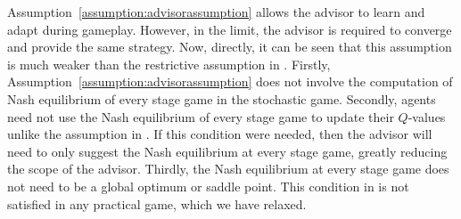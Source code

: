 \documentclass[jair, twoside,11pt,theapa]{article}
\begin{document}



Assumption~\ref{assumption:advisorassumption} allows the advisor to learn and adapt during gameplay. However, in the limit, the advisor is required to converge and provide the same strategy. Now, directly, it can be seen that this assumption is much weaker than the restrictive assumption in \citet{hu2003nash}. Firstly, Assumption~\ref{assumption:advisorassumption} does not involve the computation of Nash equilibrium of every stage game in the stochastic game. Secondly, agents need not use the Nash equilibrium of every stage game to update their $Q$-values unlike the assumption in \citet{hu2003nash}. If this condition were needed, then the advisor will need to only suggest the Nash equilibrium at every stage game, greatly reducing the scope of the advisor. 
Thirdly, the Nash equilibrium at every stage game does not need to be a global optimum or saddle point. This condition in \citet{hu2003nash} is not satisfied in any practical game, which we have relaxed. 




\end{document}
